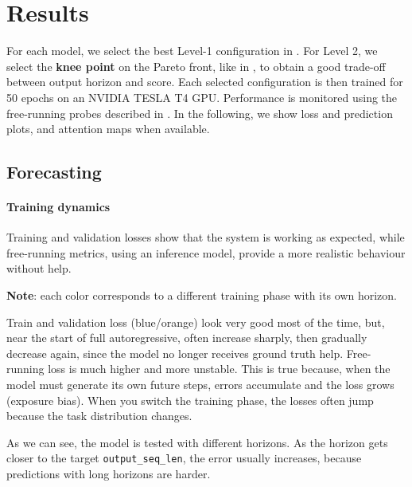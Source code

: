 \section{Results}
\label{sec:results}

For each model, we select the best Level-1 configuration in . 
For Level 2, we select the \textbf{knee point} on the Pareto front, like in , to obtain a good trade-off between output horizon and score. 
Each selected configuration is then trained for 50 epochs on an NVIDIA TESLA T4 GPU. 
Performance is monitored using the free-running probes described in . 
In the following, we show loss and prediction plots, and attention maps when available.

\subsection{Forecasting}
\label{sec:results_forecasting}

\paragraph{Training dynamics}
Training and validation losses show that the system is working as expected, while free-running metrics, using an inference model, provide a more realistic behaviour without help.
\vspace{1em}

\textbf{Note}: each color corresponds to a different training phase with its own horizon.



Train and validation loss (blue/orange) look very good most of the time, but, near the start of full autoregressive, often increase sharply, then gradually decrease again, since the model no longer receives ground truth help. Free-running loss is much higher and more unstable. This is true because, when the model must generate its own future steps, errors accumulate and the loss grows (exposure bias). When you switch the training phase, the losses often jump because the task distribution changes.



As we can see, the model is tested with different horizons. As the horizon gets closer to the target \texttt{output\_seq\_len}, the error usually increases, because predictions with long horizons are harder. 

\vspace{\baselineskip}

